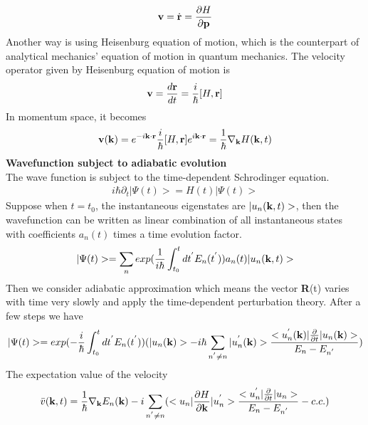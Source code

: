 \documentclass[a4paper]{article}
\begin{document}
\begin{align*}
	{\bf v} = \dot{{\bf r}} = \frac{\partial H}{\partial {\bf p}}
\end{align*}
Another way is using Heisenburg equation of motion, which is the counterpart of analytical mechanics' equation of motion in quantum mechanics. The velocity operator given by Heisenburg equation of motion is
\begin{align*}
	{\bf v} = \frac{d{\bf r}}{dt} = \frac{i}{\hbar}[H, {\bf r}]
\end{align*}
In momentum space, it becomes
\begin{align*}
	{\bf v}({\bf k}) = e^{-i{\bf k} \cdot {\bf r}} \frac{i}{\hbar}[H, {\bf r}] e^{i{\bf k} \cdot {\bf r}} = \frac{1}{\hbar} \nabla_{\bf k} H({\bf k},t)
\end{align*}
{\bf Wavefunction subject to adiabatic evolution }\\
The wave function is subject to the time-dependent Schrodinger equation.
\begin{align*}
	i \hbar \partial_t |\Psi(t) > = H(t) |\Psi(t)> 
\end{align*}
Suppose when $t= t_0$, the instantaneous eigenstates are $|u_n({\bf k}, t)>$, then
the wavefunction can be written as linear combination of all instantaneous states with coefficients $a_n(t)$ times a time evolution factor.  
\begin{align*}
	|\Psi(t)> = \sum_n exp(\frac{1}{i\hbar} \int_{t_0}^t dt^{'} E_n(t^{'})) a_n(t) |u_n({\bf k}, t)>
\end{align*}
Then we consider adiabatic approximation which means the vector {\bf R}(t) varies with time very slowly and apply the time-dependent perturbation theory. After a few steps we have
\begin{align*}
	|\Psi(t)>= exp(-\frac{i}{\hbar}\int_{t_0}^{t} dt^{'} E_{n}(t^{'}))(|u_n({\bf k})> 
	-i\hbar \sum_{n^{'}\neq n} |u_n^{'}({\bf k})>\frac{<u_n^{'}({\bf k})|\frac{\partial}{\partial t}|u_n({\bf k})>}{E_{n} - E_{n^{'}}})
\end{align*}
The expectation value of the velocity
\begin{align*}
	\bar v({\bf k},t) = \frac{1}{\hbar} \nabla_{\bf k} E_n({\bf k}) 
	- i \sum_{n^{'}\neq n} (<u_n|\frac{\partial H}{\partial {\bf k}}|u_n^{'}>\frac{<u_n^{'}|\frac{\partial}{\partial t}|u_n>}{E_{n} - E_{n^{'}}} - c.c.)
\end{align*}
\end{document}
